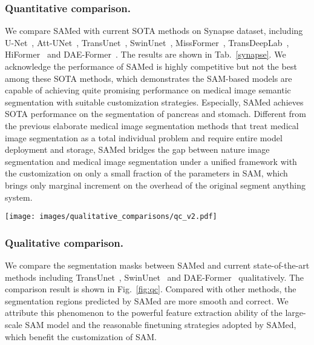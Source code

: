 \documentclass[runningheads]{llncs}
\begin{document}
\subsubsection{Quantitative comparison.} We compare SAMed with current SOTA methods on Synapse dataset, including U-Net~\cite{ronneberger2015u}, Att-UNet~\cite{oktayattention}, TransUnet~\cite{chen2021transunet}, SwinUnet~\cite{swinunet}, MissFormer~\cite{9994763}, TransDeepLab~\cite{10.1007/978-3-031-16919-9_9}, HiFormer~\cite{heidari2023hiformer} and DAE-Former~\cite{azad2023daeformer}. The results are shown in Tab.~\ref{synapse}. We acknowledge the performance of SAMed is highly competitive but not the best among these SOTA methods, which demonstrates the SAM-based models are capable of achieving quite promising performance on medical image semantic segmentation with suitable customization strategies. Especially, SAMed achieves SOTA performance on the segmentation of pancreas and stomach. Different from the previous elaborate medical image segmentation methods that treat medical image segmentation as a total individual problem and require entire model deployment and storage, SAMed bridges the gap between nature image segmentation and medical image segmentation under a unified framework with the customization on only a small fraction of the parameters in SAM, which brings only marginal increment on the overhead of the original segment anything system.

\begin{figure*}[t]
\begin{center}
\texttt{[image: images/qualitative\_comparisons/qc\_v2.pdf]}
\end{center}
   \caption{The qualitative comparisons between SAMed and the SOTA methods, including TransUnet~\cite{chen2021transunet}, SwinUnet~\cite{swinunet} and DAE-Former~\cite{azad2023daeformer}.}
\label{fig:qc}
\end{figure*}


\subsubsection{Qualitative comparison.} We compare the segmentation masks between SAMed and current state-of-the-art methods including TransUnet~\cite{chen2021transunet}, SwinUnet~\cite{swinunet} and DAE-Former~\cite{azad2023daeformer} qualitatively. The comparison result is shown in Fig.~\ref{fig:qc}. Compared with other methods, the segmentation regions predicted by SAMed are more smooth and correct. We attribute this phenomenon to the powerful feature extraction ability of the large-scale SAM model and the reasonable finetuning strategies adopted by SAMed, which benefit the customization of SAM.
\end{document}
